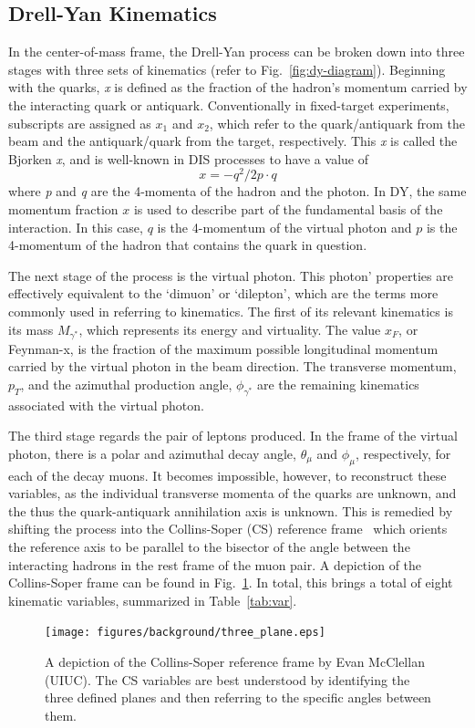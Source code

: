 \subsection{Drell-Yan Kinematics}

In the center-of-mass frame, the Drell-Yan process can be broken down into three stages with three sets of kinematics (refer to Fig.~\ref{fig:dy-diagram}). Beginning with the quarks, \emph{x} is defined as the fraction of the hadron's momentum carried by the interacting quark or antiquark. Conventionally in fixed-target experiments, subscripts are assigned as $x_1$ and $x_2$, which refer to the quark/antiquark from the beam and the antiquark/quark from the target, respectively. This \emph{x} is called the Bjorken \emph{x}, and is well-known in DIS processes to have a value of
\begin{equation}
x = -q^2/2 p \cdot q
\end{equation} where \emph{p} and \emph{q} are the 4-momenta of the hadron and the photon. In DY, the same momentum fraction $x$ is used to describe part of the fundamental basis of the interaction. In this case, $q$ is the 4-momentum of the virtual photon and $p$ is the 4-momentum of the hadron that contains the quark in question.

The next stage of the process is the virtual photon. This photon' properties are effectively equivalent to the `dimuon' or `dilepton', which are the terms more commonly used in referring to kinematics. The first of its relevant kinematics is its mass $M_{\gamma^*}$, which represents its energy and virtuality. The value $x_F$, or Feynman-x, is the fraction of the maximum possible longitudinal momentum carried by the virtual photon in the beam direction. The transverse momentum, $p_T$, and the azimuthal production angle, $\phi_{\gamma^*}$ are the remaining kinematics associated with the virtual photon.

The third stage regards the pair of leptons produced. In the frame of the virtual photon, there is a polar and azimuthal decay angle, $\theta_\mu$ and $\phi_\mu$, respectively, for each of the decay muons. It becomes impossible, however, to reconstruct these variables, as the individual transverse momenta of the quarks are unknown, and the thus the quark-antiquark annihilation axis is unknown. This is remedied by shifting the process into the Collins-Soper (CS) reference frame~\cite{PhysRevD.16.2219} which orients the reference axis to be parallel to the bisector of the angle between the interacting hadrons in the rest frame of the muon pair. A depiction of the Collins-Soper frame can be found in Fig.~\ref{fig:collins-soper}. In total, this brings a total of eight kinematic variables, summarized in Table~\ref{tab:var}.
\begin{figure}
	\centering
	\texttt{[image: figures/background/three\_plane.eps]}
	\caption{A depiction of the Collins-Soper reference frame by Evan McClellan (UIUC). The CS variables are best understood by identifying the three defined planes and then referring to the specific angles between them.}
	\label{fig:collins-soper}
\end{figure}

